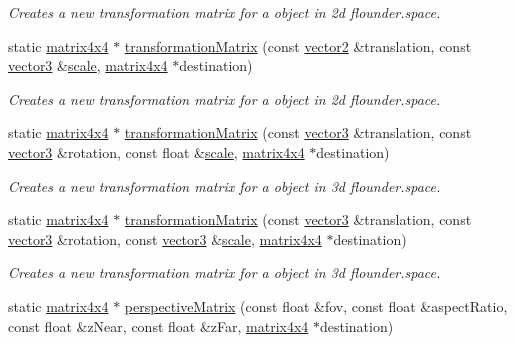 \begin{DoxyCompactItemize}
\begin{DoxyCompactList}\small\item\em Creates a new transformation matrix for a object in 2d flounder.\+space. \end{DoxyCompactList}\item 
static \hyperlink{classflounder_1_1matrix4x4}{matrix4x4} $\ast$ \hyperlink{classflounder_1_1matrix4x4_aee27febd58dbb352bc3c3b21927981b2}{transformation\+Matrix} (const \hyperlink{classflounder_1_1vector2}{vector2} \&translation, const \hyperlink{classflounder_1_1vector3}{vector3} \&\hyperlink{classflounder_1_1matrix4x4_ad7f8cccba89862a3f574b601f0744174}{scale}, \hyperlink{classflounder_1_1matrix4x4}{matrix4x4} $\ast$destination)
\begin{DoxyCompactList}\small\item\em Creates a new transformation matrix for a object in 2d flounder.\+space. \end{DoxyCompactList}\item 
static \hyperlink{classflounder_1_1matrix4x4}{matrix4x4} $\ast$ \hyperlink{classflounder_1_1matrix4x4_ad4e44d13daacf0a9d51fdf5b3fcef315}{transformation\+Matrix} (const \hyperlink{classflounder_1_1vector3}{vector3} \&translation, const \hyperlink{classflounder_1_1vector3}{vector3} \&rotation, const float \&\hyperlink{classflounder_1_1matrix4x4_ad7f8cccba89862a3f574b601f0744174}{scale}, \hyperlink{classflounder_1_1matrix4x4}{matrix4x4} $\ast$destination)
\begin{DoxyCompactList}\small\item\em Creates a new transformation matrix for a object in 3d flounder.\+space. \end{DoxyCompactList}\item 
static \hyperlink{classflounder_1_1matrix4x4}{matrix4x4} $\ast$ \hyperlink{classflounder_1_1matrix4x4_af068b46bbfe840dda2caa9d53c4a6092}{transformation\+Matrix} (const \hyperlink{classflounder_1_1vector3}{vector3} \&translation, const \hyperlink{classflounder_1_1vector3}{vector3} \&rotation, const \hyperlink{classflounder_1_1vector3}{vector3} \&\hyperlink{classflounder_1_1matrix4x4_ad7f8cccba89862a3f574b601f0744174}{scale}, \hyperlink{classflounder_1_1matrix4x4}{matrix4x4} $\ast$destination)
\begin{DoxyCompactList}\small\item\em Creates a new transformation matrix for a object in 3d flounder.\+space. \end{DoxyCompactList}\item 
static \hyperlink{classflounder_1_1matrix4x4}{matrix4x4} $\ast$ \hyperlink{classflounder_1_1matrix4x4_aaaf16a53ae9936220587eaf454bf9483}{perspective\+Matrix} (const float \&fov, const float \&aspect\+Ratio, const float \&z\+Near, const float \&z\+Far, \hyperlink{classflounder_1_1matrix4x4}{matrix4x4} $\ast$destination)

\end{DoxyCompactItemize}
